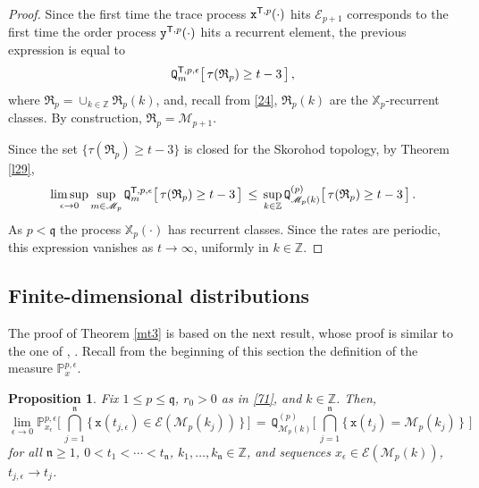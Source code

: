 \documentclass[reqno]{amsart}
\theoremstyle{plain}
\newtheorem{proposition}[theorem]{Proposition}
\theoremstyle{definition}
\newcommand{\mc}[1]{{\mathcal #1}}
\newcommand{\mf}[1]{{\mathfrak #1}}
\newcommand{\bb}[1]{{\mathbb #1}}
\newcommand{\ms}[1]{{\mathscr #1}}
\newcommand{\mss}[1]{{\textsf #1}}
\newcommand{\mtt}[1]{{\mathtt #1}}
\newcounter{as}[section]
\newcommand{\<}{\langle}
\renewcommand{\>}{\rangle}
\begin{document}
\begin{proof}
Since the first time the trace process $\mtt x^{\mss T,p} (\cdot)$
hits $\ms E_{p+1}$ corresponds to the first time the order process
$\mtt y^{\mss T,p} (\cdot)$ hits a recurrent element, the previous
expression is equal to
\begin{equation*}
\mtt Q^{\mss T, p,\epsilon}_m\big[ \, \tau  (\mf R_p) \ge t-3 \,
\big] \,,
\end{equation*}
where $\mf R_p = \cup_{k\in \bb Z} \mf R_p(k)$, and, recall from
\eqref{24}, $\mf R_p(k)$ are the $\bb X_p$-recurrent classes.
By construction, $\mf R_p = \ms M_{p+1}$.

Since the set $\{\tau  (\mf R_p) \ge t-3\}$ is closed for the Skorohod
topology, by Theorem \ref{l29},
\begin{equation*}
\limsup_{\epsilon\to 0} \sup_{m\in \ms M_p}
\mtt Q^{\mss T, p,\epsilon}_m\big[ \, \tau  (\mf R_p) \ge t-3 \,
\big] \,\le\, \sup_{k\in\bb Z}
\mtt Q^{(p)}_{\ms M_p(k)} \big[ \, \tau  (\mf R_p) \ge t-3 \,
\big] \,.
\end{equation*}
As $p<\mf q$ the process $\bb X_p(\cdot)$ has recurrent classes.
Since the rates are periodic, this expression vanishes as
$t\to\infty$, uniformly in $k\in\bb Z$. 
\end{proof}


\subsection*{Finite-dimensional distributions}

The proof of Theorem \ref{mt3} is based on the next result, whose
proof is similar to the one of \cite[Proposition 2.1]{llm},
\cite[Proposition 10.2]{lls1}. Recall from the beginning of this
section the definition of the measure $\bb P^{p, \epsilon} _{x}$.

\begin{proposition}
\label{l11}
Fix $1\le p\le \mf q$, $r_0>0$ as in \eqref{71}, and $k\in \bb Z$. Then,
\begin{equation*}
\lim_{\epsilon\rightarrow0}
\mathbb{P}_{x_\epsilon}^{p,\epsilon}
\Big[\, \bigcap_{j=1}^{{\mf n}}
\big \{\, \mtt x (t_{j,\epsilon} )
\in \mc E( \ms M_p(k_j))\, \big\} \, \Big]
\,=\, \mtt Q^{(p)}_{\ms M_p(k)}
\big[\, \bigcap_{j=1}^{{\mf n}}
\big\{ \, \mtt x (t_{j}) = \ms M_p(k_j) \, \} \, \, \big]
\end{equation*}
for all ${\mf n}\ge 1$, $0<t_{1}<\cdots<t_{{\mf n}}$,
$k_1, \dots, k_{\mf n} \in \bb Z$, and sequences
$x_\epsilon \in \mc E(\ms M_p(k))$, $t_{j,\epsilon} \to t_j$.
\end{proposition}
\end{document}
